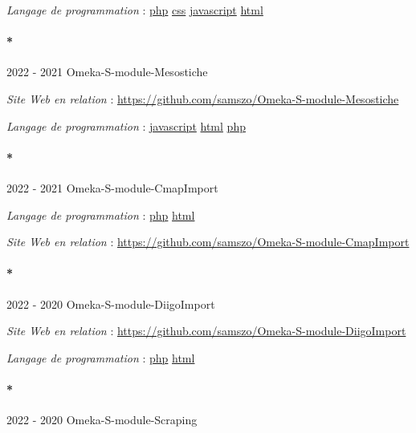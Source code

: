 \documentclass[
  a4paper,
  DIV=11,
  numbers=noendperiod]{scrreprt}
\let\oldparagraph\paragraph
\renewcommand{\paragraph}[1]{\oldparagraph{#1}\mbox{}}
\begin{document}
\emph{Langage de programmation} :
\href{http://localhost/samszo/omk/s/fiches/item/108369}{php}
\href{http://localhost/samszo/omk/s/fiches/item/102418}{css}
\href{http://localhost/samszo/omk/s/fiches/item/89711}{javascript}
\href{http://localhost/samszo/omk/s/fiches/item/96621}{html}

\paragraph*{2022 - 2021 Omeka-S-module-Mesostiche}\label{sec-item301864}

\emph{Site Web en relation} :
\url{https://github.com/samszo/Omeka-S-module-Mesostiche}

\emph{Langage de programmation} :
\href{http://localhost/samszo/omk/s/fiches/item/89711}{javascript}
\href{http://localhost/samszo/omk/s/fiches/item/96621}{html}
\href{http://localhost/samszo/omk/s/fiches/item/108369}{php}

\paragraph*{2022 - 2021 Omeka-S-module-CmapImport}\label{sec-item299718}

\emph{Langage de programmation} :
\href{http://localhost/samszo/omk/s/fiches/item/108369}{php}
\href{http://localhost/samszo/omk/s/fiches/item/96621}{html}

\emph{Site Web en relation} :
\url{https://github.com/samszo/Omeka-S-module-CmapImport}

\paragraph*{2022 - 2020
Omeka-S-module-DiigoImport}\label{sec-item301831}

\emph{Site Web en relation} :
\url{https://github.com/samszo/Omeka-S-module-DiigoImport}

\emph{Langage de programmation} :
\href{http://localhost/samszo/omk/s/fiches/item/108369}{php}
\href{http://localhost/samszo/omk/s/fiches/item/96621}{html}

\paragraph*{2022 - 2020
Omeka-S-module-Scraping}\label{omeka-s-module-scraping}
\end{document}
